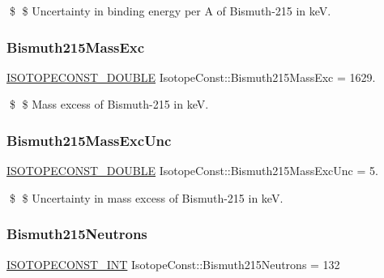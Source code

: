 \$ \$ Uncertainty in binding energy per A of Bismuth-\/215 in keV. \mbox{\label{group___isotope_const-_bismuth-_bi215_gaa0eb7f4d9937a90eca9d6323e0092352}} 
\subsubsection{\texorpdfstring{Bismuth215\+Mass\+Exc}{Bismuth215MassExc}}
{\footnotesize\ttfamily \mbox{\hyperlink{group___isotope_const-_macros_ga8f45a7272ce02c0b4c65c44636ed719a}{I\+S\+O\+T\+O\+P\+E\+C\+O\+N\+S\+T\+\_\+\+D\+O\+U\+B\+LE}} Isotope\+Const\+::\+Bismuth215\+Mass\+Exc = 1629.}

\$ \$ Mass excess of Bismuth-\/215 in keV. \mbox{\label{group___isotope_const-_bismuth-_bi215_gae469c149c8614db03ec70fb80f1d7026}} 
\subsubsection{\texorpdfstring{Bismuth215\+Mass\+Exc\+Unc}{Bismuth215MassExcUnc}}
{\footnotesize\ttfamily \mbox{\hyperlink{group___isotope_const-_macros_ga8f45a7272ce02c0b4c65c44636ed719a}{I\+S\+O\+T\+O\+P\+E\+C\+O\+N\+S\+T\+\_\+\+D\+O\+U\+B\+LE}} Isotope\+Const\+::\+Bismuth215\+Mass\+Exc\+Unc = 5.}

\$ \$ Uncertainty in mass excess of Bismuth-\/215 in keV. \mbox{\label{group___isotope_const-_bismuth-_bi215_ga8ed10a5dd17d23919f5b34cc8a0678a9}} 
\subsubsection{\texorpdfstring{Bismuth215\+Neutrons}{Bismuth215Neutrons}}
{\footnotesize\ttfamily \mbox{\hyperlink{group___isotope_const-_macros_ga5f18360b3e99483a35c32d789e62621c}{I\+S\+O\+T\+O\+P\+E\+C\+O\+N\+S\+T\+\_\+\+I\+NT}} Isotope\+Const\+::\+Bismuth215\+Neutrons = 132}

